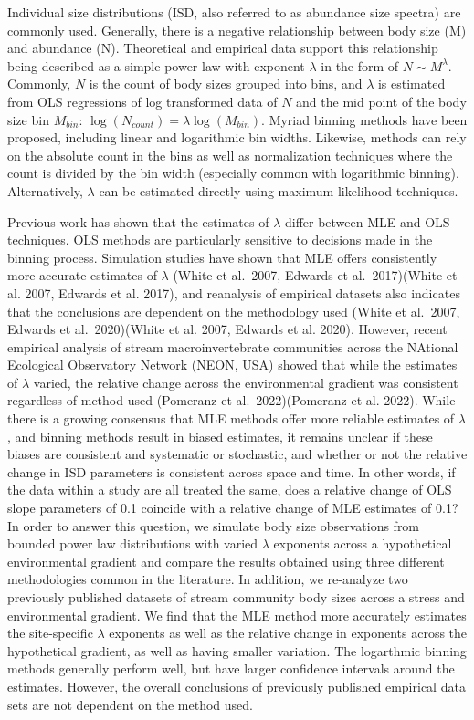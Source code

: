 \documentclass[
]{article}
\begin{document}
Individual size distributions (ISD, also referred to as abundance size
spectra) are commonly used. Generally, there is a negative relationship
between body size (M) and abundance (N). Theoretical and empirical data
support this relationship being described as a simple power law with
exponent \(\lambda\) in the form of \(N \sim M^{\lambda}\). Commonly,
\(N\) is the count of body sizes grouped into bins, and \(\lambda\) is
estimated from OLS regressions of log transformed data of \(N\) and the
mid point of the body size bin \(M_{bin}\):
\(\log(N_{count}) = \lambda \log(M_{bin})\). Myriad binning methods have
been proposed, including linear and logarithmic bin widths. Likewise,
methods can rely on the absolute count in the bins as well as
normalization techniques where the count is divided by the bin width
(especially common with logarithmic binning). Alternatively, \(\lambda\)
can be estimated directly using maximum likelihood techniques.

Previous work has shown that the estimates of \(\lambda\) differ between
MLE and OLS techniques. OLS methods are particularly sensitive to
decisions made in the binning process. Simulation studies have shown
that MLE offers consistently more accurate estimates of \(\lambda\)
(White et al.~2007, Edwards et al.~2017)(White et al. 2007, Edwards et
al. 2017), and reanalysis of empirical datasets also indicates that the
conclusions are dependent on the methodology used (White et al.~2007,
Edwards et al.~2020)(White et al. 2007, Edwards et al. 2020). However,
recent empirical analysis of stream macroinvertebrate communities across
the NAtional Ecological Observatory Network (NEON, USA) showed that
while the estimates of \(\lambda\) varied, the relative change across
the environmental gradient was consistent regardless of method used
(Pomeranz et al.~2022)(Pomeranz et al. 2022). While there is a growing
consensus that MLE methods offer more reliable estimates of \(\lambda\),
and binning methods result in biased estimates, it remains unclear if
these biases are consistent and systematic or stochastic, and whether or
not the relative change in ISD parameters is consistent across space and
time. In other words, if the data within a study are all treated the
same, does a relative change of OLS slope parameters of 0.1 coincide
with a relative change of MLE estimates of 0.1? In order to answer this
question, we simulate body size observations from bounded power law
distributions with varied \(\lambda\) exponents across a hypothetical
environmental gradient and compare the results obtained using three
different methodologies common in the literature. In addition, we
re-analyze two previously published datasets of stream community body
sizes across a stress and environmental gradient. We find that the MLE
method more accurately estimates the site-specific \(\lambda\) exponents
as well as the relative change in exponents across the hypothetical
gradient, as well as having smaller variation. The logarthmic binning
methods generally perform well, but have larger confidence intervals
around the estimates. However, the overall conclusions of previously
published empirical data sets are not dependent on the method used.
\end{document}
